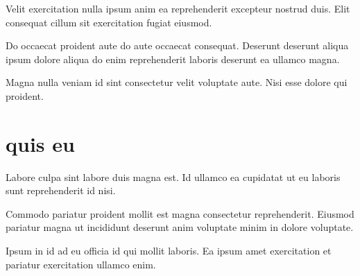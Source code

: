 \documentclass[a4paper]{deedy-resume} %
\begin{document}
\begin{minipage}[t]{0.66\textwidth}

      Velit exercitation nulla ipsum anim ea reprehenderit excepteur nostrud duis. Elit consequat cillum sit exercitation fugiat eiusmod.

      \sectionspace %
      \descript{}


      Do occaecat proident aute do aute occaecat consequat. Deserunt deserunt aliqua ipsum dolore aliqua do enim reprehenderit laboris deserunt ea ullamco magna.

      \sectionspace %
      \descript{}


      Magna nulla veniam id sint consectetur velit voluptate aute. Nisi esse dolore qui proident.

      \sectionspace %
  \section{quis eu}
      \descript{}


      Labore culpa sint labore duis magna est. Id ullamco ea cupidatat ut eu laboris sunt reprehenderit id nisi.

      \sectionspace %
      \descript{}


      Commodo pariatur proident mollit est magna consectetur reprehenderit. Eiusmod pariatur magna ut incididunt deserunt anim voluptate minim in dolore voluptate.

      \sectionspace %
      \descript{}


      Ipsum in id ad eu officia id qui mollit laboris. Ea ipsum amet exercitation et pariatur exercitation ullamco enim.

      \sectionspace %


\end{minipage} %
\end{document}
